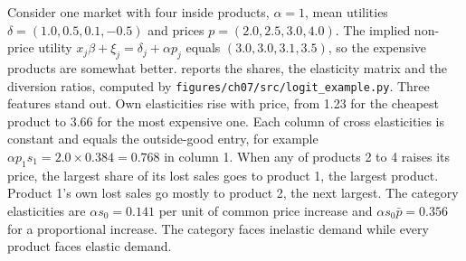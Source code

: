 \begin{example}\label{ex:07-logit-numbers}
Consider one market with four inside products, $\alpha = 1$, mean utilities $\delta = (1.0, 0.5, 0.1,
-0.5)$ and prices $p = (2.0, 2.5, 3.0, 4.0)$. The implied non-price utility $x_j\beta + \xi_j = \delta_j +
\alpha p_j$ equals $(3.0, 3.0, 3.1, 3.5)$, so the expensive products are somewhat better.
 reports the shares, the elasticity matrix and the diversion ratios, computed by
\texttt{figures/ch07/src/logit\_example.py}. Three features stand out. Own elasticities rise with price, from
1.23 for the cheapest product to 3.66 for the most expensive one. Each column of cross elasticities is
constant and equals the outside-good entry, for example $\alpha p_1 s_1 = 2.0 \times 0.384 = 0.768$ in column
1. When any of products 2 to 4 raises its price, the largest share of its lost sales goes to product 1, the
largest product. Product 1's own lost sales go mostly to product 2, the next largest. The category elasticities are $\alpha s_0 = 0.141$ per unit of common price increase and
$\alpha s_0\bar p = 0.356$ for a proportional increase. The category faces inelastic demand while every
product faces elastic demand.
\end{example}

